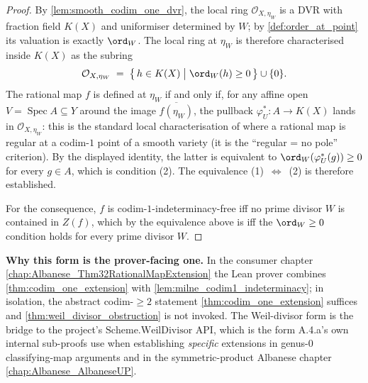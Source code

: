 \begin{proof}
  
  By \cref{lem:smooth_codim_one_dvr}, the local ring \(\mathcal O_{X, \eta_W}\) is a
  DVR with fraction field \(K(X)\) and uniformiser determined by \(W\); by
  \cref{def:order_at_point} its valuation is exactly \(\ord_W\). The local ring at
  \(\eta_W\) is therefore characterised inside \(K(X)\) as the subring
  \[
    \mathcal O_{X, \eta_W} \;=\; \bigl\{\, h \in K(X) \;\big|\; \ord_W(h) \geq 0
    \,\bigr\} \cup \{0\}.
  \]
  The rational map \(f\) is defined at \(\eta_W\) if and only if, for any affine open
  \(V = \operatorname{Spec} A \subseteq Y\) around the image \(\overline{f(\eta_W)}\),
  the pullback \(\varphi_U^\ast \colon A \to K(X)\) lands in
  \(\mathcal O_{X, \eta_W}\): this is the standard local characterisation of where a
  rational map is regular at a codim-\(1\) point of a smooth variety (it is the
  ``regular = no pole'' criterion). By the displayed identity, the latter is
  equivalent to \(\ord_W(\varphi_U^\ast(g)) \geq 0\) for every \(g \in A\), which is
  condition (2). The equivalence (1)~\(\Leftrightarrow\)~(2) is therefore established.

  For the consequence, \(f\) is codim-\(1\)-indeterminacy-free iff no prime divisor \(W\) is
  contained in \(Z(f)\), which by the equivalence above is iff the \(\ord_W \geq 0\)
  condition holds for every prime divisor \(W\).
\end{proof}

\begin{remark}
  \label{rmk:weil_obstruction_application}
  \textbf{Why this form is the prover-facing one.} In the consumer chapter
  \cref{chap:Albanese_Thm32RationalMapExtension} the Lean prover combines
  \cref{thm:codim_one_extension} with \cref{lem:milne_codim1_indeterminacy}; in
  isolation, the abstract codim-\(\geq 2\) statement
  \cref{thm:codim_one_extension} suffices and \cref{thm:weil_divisor_obstruction}
  is not invoked. The Weil-divisor form is the bridge to the project's
  \(\mathrm{Scheme.WeilDivisor}\) API, which is the form A.4.a's own internal sub-proofs
  use when establishing \emph{specific} extensions in genus-\(0\) classifying-map
  arguments and in the symmetric-product Albanese chapter
  \cref{chap:Albanese_AlbaneseUP}.
\end{remark}

